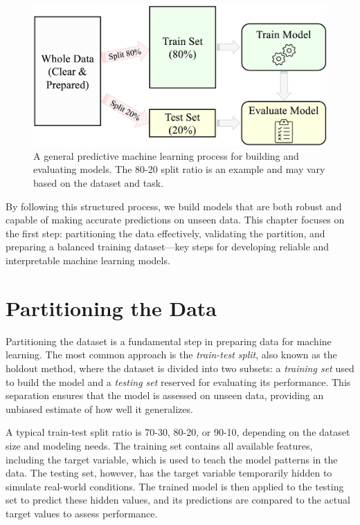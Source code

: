 \documentclass[
  11pt,
]{book}
\theoremstyle{definition}
\theoremstyle{definition}
\theoremstyle{definition}
\theoremstyle{definition}
\theoremstyle{remark}
\begin{document}
\begin{figure}[H]

{\centering \includegraphics[width=0.8\linewidth]{images/ch6_partitioning} 

}

\caption{A general predictive machine learning process for building and evaluating models. The 80-20 split ratio is an example and may vary based on the dataset and task.}\label{fig:modeling}
\end{figure}

By following this structured process, we build models that are both robust and capable of making accurate predictions on unseen data. This chapter focuses on the first step: partitioning the data effectively, validating the partition, and preparing a balanced training dataset---key steps for developing reliable and interpretable machine learning models.

\section{Partitioning the Data}\label{sec-partitioning}

Partitioning the dataset is a fundamental step in preparing data for machine learning. The most common approach is the \emph{train-test split}, also known as the holdout method, where the dataset is divided into two subsets: a \emph{training set} used to build the model and a \emph{testing set} reserved for evaluating its performance. This separation ensures that the model is assessed on unseen data, providing an unbiased estimate of how well it generalizes.

A typical train-test split ratio is 70-30, 80-20, or 90-10, depending on the dataset size and modeling needs. The training set contains all available features, including the target variable, which is used to teach the model patterns in the data. The testing set, however, has the target variable temporarily hidden to simulate real-world conditions. The trained model is then applied to the testing set to predict these hidden values, and its predictions are compared to the actual target values to assess performance.
\end{document}
